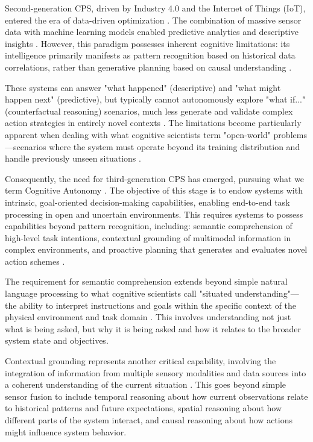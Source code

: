Second-generation CPS, driven by Industry 4.0 and the Internet of Things (IoT), entered the era of data-driven optimization \cite{lasi2014industry, xu2018industry}. The combination of massive sensor data with machine learning models enabled predictive analytics and descriptive insights \cite{tao2018digital, grieves2014digital}. However, this paradigm possesses inherent cognitive limitations: its intelligence primarily manifests as pattern recognition based on historical data correlations, rather than generative planning based on causal understanding \cite{pearl2019seven, peters2017elements}. 

These systems can answer "what happened" (descriptive) and "what might happen next" (predictive), but typically cannot autonomously explore "what if..." (counterfactual reasoning) scenarios, much less generate and validate complex action strategies in entirely novel contexts \cite{pearl2000causality, spirtes2000causation}. The limitations become particularly apparent when dealing with what cognitive scientists term "open-world" problems—scenarios where the system must operate beyond its training distribution and handle previously unseen situations \cite{hendrycks2019natural, koh2021wilds}.

Consequently, the need for third-generation CPS has emerged, pursuing what we term Cognitive Autonomy \cite{chen2020cognitive, zhang2021cognitive}. The objective of this stage is to endow systems with intrinsic, goal-oriented decision-making capabilities, enabling end-to-end task processing in open and uncertain environments. This requires systems to possess capabilities beyond pattern recognition, including: semantic comprehension of high-level task intentions, contextual grounding of multimodal information in complex environments, and proactive planning that generates and evaluates novel action schemes \cite{lake2017building, marcus2020next}.

The requirement for semantic comprehension extends beyond simple natural language processing to what cognitive scientists call "situated understanding"—the ability to interpret instructions and goals within the specific context of the physical environment and task domain \cite{smith1987situated, suchman1987plans}. This involves understanding not just what is being asked, but why it is being asked and how it relates to the broader system state and objectives.

Contextual grounding represents another critical capability, involving the integration of information from multiple sensory modalities and data sources into a coherent understanding of the current situation \cite{harnad1990symbol, barsalou2008grounded}. This goes beyond simple sensor fusion to include temporal reasoning about how current observations relate to historical patterns and future expectations, spatial reasoning about how different parts of the system interact, and causal reasoning about how actions might influence system behavior.

